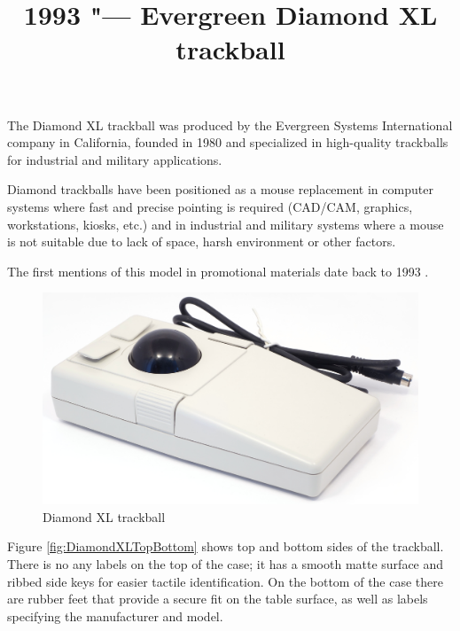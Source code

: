 \documentclass[11pt, a4paper]{article}
\begin{document}
\title{1993 "--- Evergreen Diamond XL trackball}
\date{}
\maketitle
{}
The Diamond XL trackball was produced by the Evergreen Systems International company in California, founded in 1980 and specialized in high-quality trackballs for industrial and military applications.

Diamond trackballs have been positioned as a mouse replacement in computer systems where fast and precise pointing is required (CAD/CAM, graphics, workstations, kiosks, etc.) and in industrial and military systems where a mouse is not suitable due to lack of space, harsh environment or other factors.

The first mentions of this model in promotional materials date back to 1993 \cite{nasa}.

\begin{figure}[h]
    \centering
    \includegraphics[scale=0.33]{1993_evergreen_diamond_xl_trackball/pic_30.jpg}
    \caption{Diamond XL trackball}
    \label{fig:DiamondXL}
\end{figure}

Figure \ref{fig:DiamondXLTopBottom} shows top and bottom sides of the trackball.
There is no any labels on the top of the case; it has a smooth matte surface and ribbed side keys for easier tactile identification. On the bottom of the case there are rubber feet that provide a secure fit on the table surface, as well as labels specifying the manufacturer and model.
\end{document}
